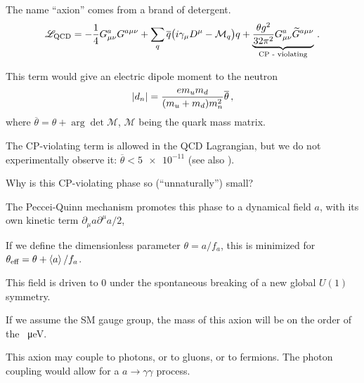 \documentclass[main.tex]{subfiles}
\begin{document}

The name ``axion'' comes from a brand of detergent. 
%
\begin{align}
\mathscr{L} _{\text{QCD}}
= - \frac{1}{4} G^{a}_{\mu \nu }
G^{a \mu \nu }
+ \sum _{q} 
\overline{q} \qty(i \gamma_{\mu } D^{\mu } - \mathcal{M}_q) q 
+
\underbrace{\frac{\theta g^2}{32 \pi^2} G^{a}_{\mu \nu }
\widetilde{G}^{a \mu \nu }}_{\text{CP - violating}}
\,.
\end{align}


This term would give an electric dipole moment to the neutron 
%
\begin{align}
\abs{d_n} = \frac{e m_u m_d}{(m_u + m_d) m_n^2} \overline{\theta}
\,,
\end{align}
%
where \(\overline{\theta} = \theta + \arg \det \mathcal{M}\), \(\mathcal{M}\) being the quark mass matrix. 

The CP-violating term is allowed in the QCD Lagrangian, but we do not experimentally observe it: \(\overline{\theta} < \num{5e-11}\) \cite{chadha-dayAxionDarkMatter2021} (see also \textcite[]{kolbEarlyUniverse1994}).


Why is this CP-violating phase so (``unnaturally'') small? 

The Peccei-Quinn mechanism promotes this phase to a dynamical field \(a\), with its own kinetic term \(\partial_{\mu } a \partial^{\mu } a  / 2\), 

If we define the dimensionless parameter \(\theta = a / f_a\), this is minimized for \(\theta _{\text{eff}} = \theta + \expval{a} / f_a\).

This field is driven to 0 under the spontaneous breaking of a new global \(U(1)\) symmetry.

If we assume the SM gauge group, the mass of this axion will be on the order of the \SI{}{\micro eV}. 

This axion may couple to photons, or to gluons, or to fermions. 
The photon coupling would allow for a \(a \to \gamma \gamma \) process.
\end{document}
